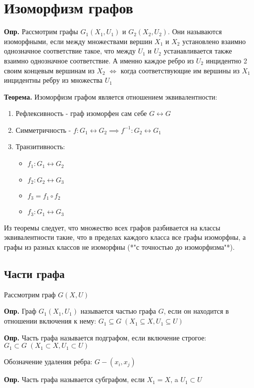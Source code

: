 \documentclass[10pt]{article}
\begin{document}
\section*{Изоморфизм графов}
\par\textbf{Опр.} Рассмотрим графы $G_{1} (X_{1}, U_{1})$ и $G_{2}(X_{2}, U_{2})$. Они называются изоморфными, если между множествами вершин $X_{1}$ и $X_{2}$ установлено взаимно однозначное соответствие такое, что между $U_{1}$ и $U_{2}$ устанавливается также взаимно однозначное соответствие. А именно каждое ребро из $U_{2}$ инцидентно 2 своим концевым вершинам из $X_{2}$ $\iff$ когда соответствующие им вершины из $X_{1}$ инцидентны ребру из множества $U_{1}$
\par\textbf{Теорема.} Изоморфизм графом является отношением эквивалентности:
\begin{enumerate}
    \item Рефлексивность - граф изоморфен сам себе $G \leftrightarrow G$
    \item Симметричность - $f: G_{1} \leftrightarrow G_{2} \implies f^{-1}: G_{2} \leftrightarrow G_{1}$
    \item Транзитивность:
    \begin{itemize}
        \item $f_{1}: G_{1} \leftrightarrow G_{2}$
        \item $f_{2}: G_{2} \leftrightarrow G_{3}$
        \item $f_3 = f_{1} \circ f_{2}$
        \item $f_{3}: G_{1} \leftrightarrow G_{3}$
    \end{itemize}
\end{enumerate}

\par Из теоремы следует, что множество всех графов разбивается на классы эквивалентности такие, что в пределах каждого класса все графы изоморфны, а графы из разных классов не изоморфны (*"с точностью до изоморфизма"*).
\subsection*{Части графа}
\par Рассмотрим граф $G(X, U)$
\par\textbf{Опр.} Граф $G_{1}(X_{1}, U_{1})$ называется частью графа $G$, если он находится в отношении включения к нему: $G_{1} \subseteq G \; (X_{1} \subseteq X, U_{1} \subseteq U)$
\par\textbf{Опр.} Часть графа называется подграфом, если включение строгое: $G_{1} \subset G \; (X_{1} \subset X, U_{1} \subset U)$
\par Обозначение удаления ребра: $G - (x_{i}, x_{j})$
\par\textbf{Опр.} Часть графа называется субграфом, если $X_{1} = X$, a $U_{1} \subset U$
\end{document}
